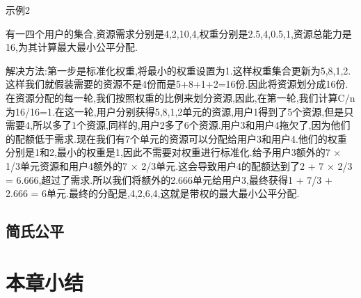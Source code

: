 示例2

有一四个用户的集合,资源需求分别是4,2,10,4,权重分别是2.5,4,0.5,1,资源总能力是16,为其计算最大最小公平分配.

解决方法:第一步是标准化权重,将最小的权重设置为1.这样权重集合更新为5,8,1,2.这样我们就假装需要的资源不是4份而是5+8+1+2=16份.因此将资源划分成16份.在资源分配的每一轮,我们按照权重的比例来划分资源,因此,在第一轮,我们计算C/n为16/16=1.在这一轮,用户分别获得5,8,1,2单元的资源,用户1得到了5个资源,但是只需要4,所以多了1个资源,同样的,用户2多了6个资源.用户3和用户4拖欠了,因为他们的配额低于需求.现在我们有7个单元的资源可以分配给用户3和用户4.他们的权重分别是1和2,最小的权重是1,因此不需要对权重进行标准化.给予用户3额外的7 × 1/3单元资源和用户4额外的7 × 2/3单元.这会导致用户4的配额达到了2 + 7 × 2/3 = 6.666,超过了需求.所以我们将额外的2.666单元给用户3,最终获得1 + 7/3 + 2.666 = 6单元.最终的分配是,4,2,6,4,这就是带权的最大最小公平分配.
\subsection{简氏公平}
\section{本章小结}
